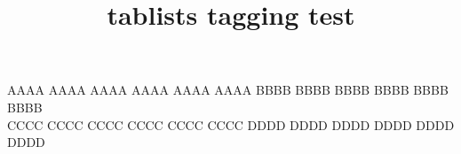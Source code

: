 \documentclass{article}
\title{tablists tagging test}
\begin{document}
\begin{tabenum}[\bfseries1)]%
\tabenumitem AAAA AAAA AAAA AAAA AAAA AAAA
\tabenumitem BBBB BBBB BBBB BBBB BBBB BBBB \\
\tabenumitem CCCC CCCC CCCC CCCC CCCC CCCC
\tabenumitem DDDD DDDD DDDD DDDD DDDD DDDD
\end{tabenum}
\end{document}
